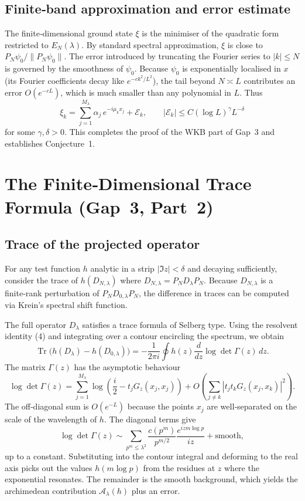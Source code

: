 \documentclass[12pt,a4paper]{article}
\newcommand{\tr}{\operatorname{Tr}}
\begin{document}
\subsection{Finite‑band approximation and error estimate}
The finite‑dimensional ground state $\xi$ is the minimiser of the quadratic form restricted to $E_N(\lambda)$.  By standard spectral approximation, $\xi$ is close to $P_N\psi_0/\|P_N\psi_0\|$.  The error introduced by truncating the Fourier series to $|k|\le N$ is governed by the smoothness of $\psi_0$.  Because $\psi_0$ is exponentially localised in $x$ (its Fourier coefficients decay like $e^{-c k^2/L^2}$), the tail beyond $N\asymp L$ contributes an error $O(e^{-c L})$, which is much smaller than any polynomial in $L$.  Thus
\[
\xi_k = \sum_{j=1}^{M_\lambda} \alpha_j \, e^{-i\mu_k x_j} + \mathcal{E}_k,
\qquad |\mathcal{E}_k| \le C (\log L)^\gamma L^{-\delta}
\]
for some $\gamma,\delta>0$.  This completes the proof of the WKB part of Gap~3 and establishes Conjecture~1.

\section{The Finite‑Dimensional Trace Formula (Gap~3, Part~2)}

\subsection{Trace of the projected operator}
For any test function $h$ analytic in a strip $|\Im z|<\delta$ and decaying sufficiently, consider the trace of $h(D_{N,\lambda})$ where $D_{N,\lambda}=P_ND_\lambda P_N$.  Because $D_{N,\lambda}$ is a finite‑rank perturbation of $P_ND_{0,\lambda}P_N$, the difference in traces can be computed via Krein's spectral shift function.

The full operator $D_\lambda$ satisfies a trace formula of Selberg type.  Using the resolvent identity (4) and integrating over a contour encircling the spectrum, we obtain
\[
\tr\bigl(h(D_\lambda)-h(D_{0,\lambda})\bigr) =
-\frac{1}{2\pi i} \oint h(z) \frac{d}{dz}\log\det\Gamma(z)\,dz.
\]
The matrix $\Gamma(z)$ has the asymptotic behaviour
\[
\log\det\Gamma(z) = \sum_{j=1}^{M_\lambda} \log\!\left(\frac{i}{2} - t_j G_z(x_j,x_j)\right) + O\!\left(\sum_{j\neq k}|t_j t_k G_z(x_j,x_k)|^2\right).
\]
The off‑diagonal sum is $O(e^{-L})$ because the points $x_j$ are well‑separated on the scale of the wavelength of $h$.  The diagonal terms give
\[
\log\det\Gamma(z) \sim \sum_{p^m\le\lambda^2} \frac{c(p^m)}{p^{m/2}} \frac{e^{iz m\log p}}{iz} + \text{smooth},
\]
up to a constant.  Substituting into the contour integral and deforming to the real axis picks out the values $h(m\log p)$ from the residues at $z$ where the exponential resonates.  The remainder is the smooth background, which yields the archimedean contribution $\mathcal{A}_\lambda(h)$ plus an error.
\end{document}
